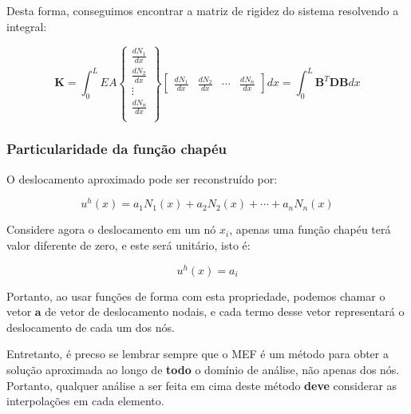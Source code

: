         Desta forma, conseguimos encontrar a matriz de rigidez do sistema resolvendo a integral:

        \begin{equation}
            \mathbf{K} = \int_0^L EA 
            \begin{Bmatrix}
            \frac{dN_1}{dx}\\
            \frac{dN_2}{dx}\\
            \vdots\\
            \frac{dN_n}{dx}\\
            \end{Bmatrix}
            \begin{bmatrix}
            \frac{dN_1}{dx} &
            \frac{dN_2}{dx} &
            \cdots &
            \frac{dN_n}{dx}
            \end{bmatrix} dx
            = \int_0^L \mathbf{B}^T \mathbf{D}\mathbf{B} dx
        \end{equation}

        \subsubsection*{Particularidade da função chapéu}

            O deslocamento aproximado pode ser reconstruído por:

            \begin{equation}
                u^h(x) = a_1 N_1(x) + a_2 N_2(x) + \cdots + a_n N_n(x)
            \end{equation}

            Considere agora o deslocamento em um nó $x_i$, apenas uma função chapéu terá valor diferente de zero, e este será unitário, isto é:

            \begin{equation}
                u^h(x) = a_i
            \end{equation}

            Portanto, ao usar funções de forma com esta propriedade, podemos chamar o vetor $\mathbf{a}$ de vetor de deslocamento nodais, e cada termo desse vetor representará o deslocamento de cada um dos nós.

            Entretanto, é precso se lembrar sempre que o MEF é um método para obter a solução aproximada ao longo de \textbf{todo} o domínio de análise, não apenas dos nós. Portanto, qualquer análise a ser feita em cima deste método \textbf{deve} considerar as interpolações em cada elemento.

